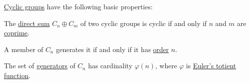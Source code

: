 \begin{proposition}\label{thm:def:cyclic_group}
  \hyperref[def:cyclic_group]{Cyclic groups} have the following basic properties:
  \begin{thmenum}
     The \hyperref[def:semimodule_direct_sum]{direct sum} \( C_n \oplus C_m \) of two cyclic groups is cyclic if and only if \( n \) and \( m \) are \hyperref[def:coprime_elements]{coprime}.

     A member of \( C_n \) generates it if and only if it has \hyperref[def:group_element_order]{order} \( n \).

     The set of \hyperref[def:object_presentation]{generators} of \( C_n \) has cardinality \( \varphi(n) \), where \( \varphi \) is \hyperref[def:eulers_totient_function]{Euler's totient function}.
  \end{thmenum}
\end{proposition}
